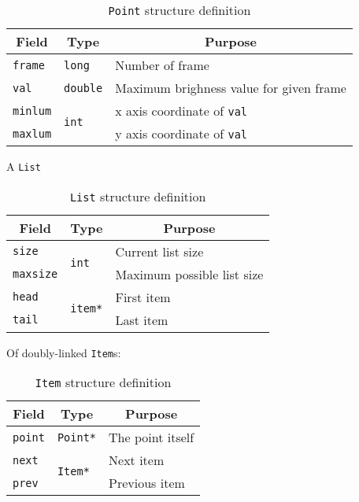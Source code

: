 \documentclass[a4paper,11pt]{memoir}
\begin{document}
\begin{table}[H]
\centering
\caption{\texttt{Point} structure definition}
\label{my-label}
\begin{tabular}{|m{}|m{}|m{}|}
\hline
\multicolumn{1}{|c|}{\textbf{Field}} & \multicolumn{1}{c|}{\textbf{Type}} & \multicolumn{1}{c|}{\textbf{Purpose}} \\ \hline
\texttt{frame} & \texttt{long} & Number of frame \\ \hline
\texttt{val} & \texttt{double} & Maximum brighness value for given frame \\ \hline
\texttt{minlum} & \multirow{2}{*}{\texttt{int}} & x axis coordinate of \texttt{val} \\ \cline{1-1} \cline{3-3}
\texttt{maxlum} & & y axis coordinate of \texttt{val} \\ \hline
\end{tabular}
\end{table}

A \texttt{List}

\begin{table}[H]
\centering
\caption{\texttt{List} structure definition}
\label{my-label}
\begin{tabular}{|m{}|m{}|m{}|}
\hline
\multicolumn{1}{|c|}{\textbf{Field}} & \multicolumn{1}{c|}{\textbf{Type}} & \multicolumn{1}{c|}{\textbf{Purpose}} \\ \hline
\texttt{size} & \multirow{2}{*}{\texttt{int}} & Current list size \\ \cline{1-1} \cline{3-3}
\texttt{maxsize} & & Maximum possible list size \\ \hline
\texttt{head} & \multirow{2}{*}{\texttt{item*}} & First item \\ \cline{1-1} \cline{3-3}
\texttt{tail} & & Last item \\ \hline
\end{tabular}
\end{table}

Of doubly-linked \texttt{Item}s: 

\begin{table}[H]
\centering
\caption{\texttt{Item} structure definition}
\label{my-label}
\begin{tabular}{|m{}|m{}|m{}|}
\hline
\multicolumn{1}{|c|}{\textbf{Field}} & \multicolumn{1}{c|}{\textbf{Type}} & \multicolumn{1}{c|}{\textbf{Purpose}} \\ \hline
\texttt{point} & \texttt{Point*} & The point itself \\ \hline
\texttt{next} & \multirow{2}{*}{\texttt{Item*}} & Next item \\ \cline{1-1} \cline{3-3}
\texttt{prev} & & Previous item \\ \hline
\end{tabular}
\end{table}
\end{document}

